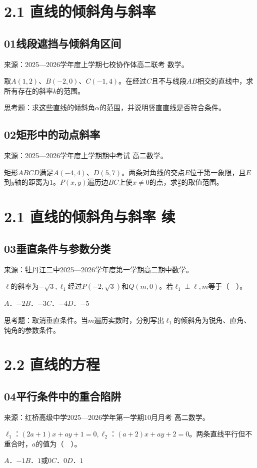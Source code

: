 \documentclass[UTF8,11pt,a4paper,fontset=windows]{ctexart}
\newcommand{\qhead}[2]{\subsection{#1\texorpdfstring{\quad}{ }#2}}
\newcommand{\qsource}[1]{{\footnotesize 来源：#1。\par}}
\begin{document}
\section{2.1 直线的倾斜角与斜率}

\qhead{01}{线段遮挡与倾斜角区间}
\qsource{2025—2026学年度上学期七校协作体高二联考 数学}
取\(A\left(1,\allowbreak 2\right)\)、\(B\left(- 2,\allowbreak 0\right)\)、\(C\left(- 1,\allowbreak 4\right)\)。在经过\(C\)且不与线段\(AB\)相交的直线中，求所有存在的斜率\(k\)的范围。\par
思考题：求这些直线的倾斜角\(\alpha \)的范围，并说明竖直直线是否符合条件。\par
\vspace{12mm}\vfill

\qhead{02}{矩形中的动点斜率}
\qsource{2025—2026学年度上学期期中考试 高二数学}
矩形\(ABCD\)满足\(A\left(- 4,\allowbreak 4\right)\)、\(D\left(5,\allowbreak 7\right)\)。两条对角线的交点\(E\)位于第一象限，且\(E\)到\(y\)轴的距离为\(1\)。\(P\left(x,\allowbreak y\right)\)遍历边\(BC\)上使\(x\ne 0\)的点，求\(\frac{y}{x}\)的取值范围。\par
\vspace{12mm}\vfill

\mbox{}

\clearpage

\section{2.1 直线的倾斜角与斜率 续}

\qhead{03}{垂直条件与参数分类}
\qsource{牡丹江二中2025—2026学年度第一学期高二期中数学}
\(\ell \)的斜率为\(- \sqrt{3},\allowbreak \ell _{1}\)经过\(P\left(- 2,\allowbreak \sqrt{3}\right)\)和\(Q\left(m,\allowbreak 0\right)\)。若\(\ell _{1}\perp \ell ,\allowbreak m\)等于（　）。\par
\(A\)．\(- 2\)\qquad \(B\)．\(- 3\)\qquad \(C\)．\(- 4\)\qquad \(D\)．\(- 5\)\par
思考题：取消垂直条件。当\(m\)遍历实数时，分别写出\(\ell _{1}\)的倾斜角为锐角、直角、钝角的参数条件。\par
\vspace{12mm}\vfill

\mbox{}

\clearpage

\section{2.2 直线的方程}

\qhead{04}{平行条件中的重合陷阱}
\qsource{红桥高级中学2025—2026学年第一学期10月月考 高二数学}
\(\ell _{1}\)：\(\left(2a+ 1\right)x+ ay+ 1= 0,\allowbreak \ell _{2}\)：\(\left(a+ 2\right)x+ ay+ 2= 0\)。两条直线平行但不重合时，\(a\)的值为（　）。\par
\(A\)．\(- 1\)\qquad \(B\)．\(1\)或\(0\)\qquad \(C\)．\(0\)\qquad \(D\)．\(1\)\par
\vspace{12mm}\vfill
\end{document}
